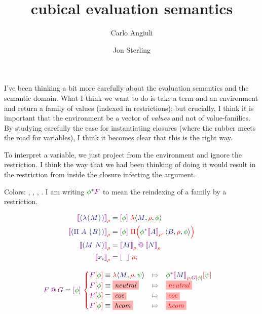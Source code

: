 \documentclass{article}
\title{cubical evaluation semantics}
\author{Carlo Angiuli \and Jon Sterling}
\newcommand\Eval[2]{
  \FmtFam{
    {\left\llbracket\FmtTm{#1}\right\rrbracket}_{\FmtVal{#2}}
  }
}
\begin{document}
\maketitle

I've been thinking a bit more carefully about the evaluation semantics and the
semantic domain. What I think we want to do is take a term and an environment
and return a family of values (indexed in restrictions); but crucially, I think
it is important that the environment be a vector of \emph{values} and not of
value-families. By studying carefully the case for instantiating closures
(where the rubber meets the road for variables), I think it becomes clear that
this is the right way.

To interpret a variable, we just project from the environment and ignore the
restriction. I think the way that we had been thinking of doing it would result
in the restriction from inside the closure infecting the argument.

\bigskip


Colors: , , ,
. I am writing $\Rst{\phi}{F}$ to mean the reindexing of a
family by a restriction.

\begin{align*}
  \Eval{
    \TLam{M}
  }{\rho}
  &=
  \Fam{\phi}{
    \VLam{
      \VClo{M}{\rho}{\phi}
    }
  }
  \\
  \Eval{
    \TPi{A}{B}
  }{\rho}
  &=
  \Fam{\phi}{
    \VPi{
      \Rst{\phi}{\Eval{A}{\rho}}
    }{
      \VClo{B}{\rho}{\phi}
    }
  }
  \\
  \Eval{
    \TApp{M}{N}
  }{\rho}
  &=
  \SemApp{
    \Eval{M}{\rho}
  }{
    \Eval{N}{\rho}
  }
  \\
  \Eval{
    \TVar{i}
  }{\rho}
  &=
  \Fam{\_}{
    \rho_i
  }
\end{align*}

\begin{align*}
  \SemApp{F}{G}
  &=
  \Fam{\phi}{
    \begin{cases}
      \Cond{
        \FamTest{F}{\phi}
        \equiv
        \VLam{
          \VClo{M}{\rho}{\psi}
        }
      }{
        \FamTest{
          \Rst{\phi}{\Eval{M}{\rho, \FamTest{G}{\phi}}}
        }{
          \psi
        }
      }
      \\
      \Cond{
        \FamTest{F}{\phi}
        \equiv
        \Hole{neutral}
      }{
        \Hole{neutral}
      }
      \\
      \Cond{
        \FamTest{F}{\phi}
        \equiv
        \Hole{coe}
      }{
        \Hole{coe}
      }
      \\
      \Cond{
        \FamTest{F}{\phi}
        \equiv
        \Hole{hcom}
      }{
        \Hole{hcom}
      }
    \end{cases}
  }
\end{align*}
\end{document}
